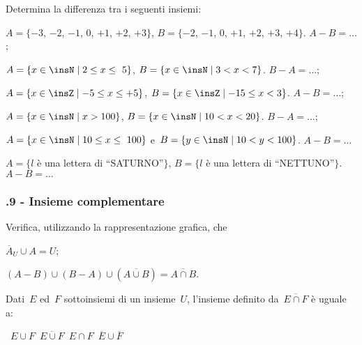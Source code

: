 \begin{esercizio}
\label{ese:\thechapter.62}
Determina la differenza tra i seguenti insiemi:
\begin{enumeratea}
\item $A=\{-3$, $-2$, $-1$, $0$, $+1$, $+2$, $+3\}$, $B=\{-2$, $-1$, $0$, $+1$, $+2$, $+3$, $+4\}$. $A-B=\ldots$;
\item $A=\{x\in\insN\mid 2\le x\le~5\}$, $B=\{x\in\insN\mid 3<x<7\}$. $B-A=\ldots$;
\item $A=\{x\in\insZ\mid -5\le x\le +5\}$, $B=\{x\in\insZ\mid -15\le x<3\}$. $A-B=\ldots$;
\item $A=\{x\in\insN\mid x>100\}$, $B=\{x\in\insN\mid 10<x<20\}$. $B-A=\ldots$;
\item $A=\{x\in\insN\mid 10\le x\le~100\}$ e~$B=\{y\in\insN\mid 10<y<100\}$. $A-B=\ldots$
\item $A=\{l$ è una lettera di ``SATURNO''$\}$, $B=\{l$ è una lettera di ``NETTUNO''$\}$. $A-B=\ldots$
\end{enumeratea}
\end{esercizio}

\subsubsection*{\thechapter.9 - Insieme complementare}
\begin{esercizio}
\label{ese:\thechapter.63}
Verifica, utilizzando la rappresentazione grafica, che
\begin{multicols}{2}
 \begin{enumeratea}
 \item $\overline{A}_{U}\cup A=U$;
 \item $(A-B)\cup (B-A)\cup (\overline{A\cup B})=\overline{A\cap B}$.
 \end{enumeratea}
\end{multicols}
\end{esercizio}

\begin{esercizio}
 \label{ese:\thechapter.64}
Dati~$E$ ed~$F$ sottoinsiemi di un insieme~$U$, l'insieme
definito da~$\overline{E\cap F}$ è uguale a:
\begin{center}
\boxA\quad~$E\cup F$\quad\boxB\quad~$\overline{E\cup F}$\quad\boxC\quad~$E\cap F$\quad\boxD\quad~$\overline{E}\cup\overline{F}$
\end{center}
\end{esercizio}

